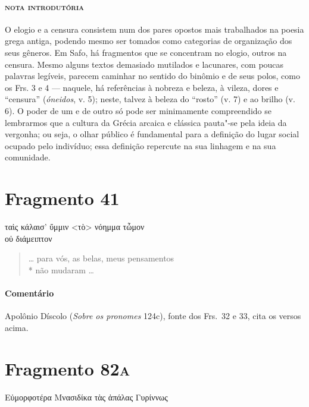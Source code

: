 {\paragraph{\textsc{nota introdutória}}
O elogio e a censura consistem num dos pares opostos mais trabalhados na poesia
grega antiga, podendo mesmo ser tomados como categorias de organização dos seus gêneros.
Em Safo, há fragmentos que se concentram no
elogio, outros na
censura. Mesmo alguns textos demasiado mutilados e lacunares, com poucas palavras legíveis, parecem caminhar no sentido do binômio e de seus polos, como os Frs. 3 e 4 --- naquele, há referências à nobreza e beleza, à vileza, dores e ``censura'' (\textit{óneidos}, v. 5); neste, talvez à beleza do ``rosto'' (v. 7) e ao brilho (v. 6). O poder de um e de outro só pode ser
minimamente compreendido se lembrarmos que a cultura da Grécia arcaica e
clássica pauta"-se pela ideia da vergonha; ou seja, o olhar público é
fundamental para a definição do lugar social ocupado pelo indivíduo; essa
definição repercute na sua linhagem e na sua comunidade. 

\section{Fragmento 41}

\begin{gkverse}
ταὶς κάλαισ’ ὔμμιν <τὸ> νόημμα τὦμον\\
       οὐ διάμειπτον
\end{gkverse}

\begin{verse}
\ldots{} para vós, as belas, meus pensamentos\\*
não mudaram \ldots{}
\end{verse}

{\paragraph{Comentário} Apolônio Díscolo (\textit{Sobre os pronomes} 124c), fonte dos Frs.~32 e 33, cita os versos acima.}


\pagebreak
\section{Fragmento 82\textsc{a}}

\begin{gkverse}
Εὐμορφοτέρα Μνασιδίκα τὰς ἀπάλας Γυρίννως
\end{gkverse}

}
